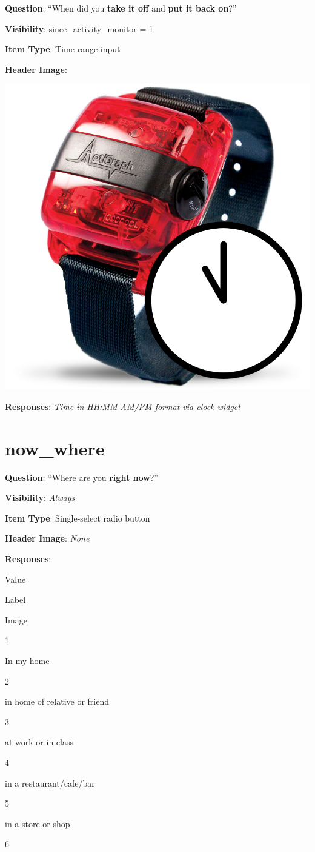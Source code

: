 \documentclass[]{book}
\begin{document}
\textbf{Question}: ``When did you \textbf{take it off} and \textbf{put it back on}?''

\textbf{Visibility}: \protect\hyperlink{since_activity_monitor}{since\_activity\_monitor} = 1

\textbf{Item Type}: Time-range input

\textbf{Header Image}:

\begin{flushleft}\includegraphics[width=0.33\linewidth]{downloadFigs4latex_NIMH_Applet_Codebook/since_activity_monitor_time_headerImg} \end{flushleft}

\textbf{Responses}: \emph{Time in HH:MM AM/PM format via clock widget}

\hypertarget{now_where}{%
\section{now\_where}\label{now_where}}

\textbf{Question}: ``Where are you \textbf{right now}?''

\textbf{Visibility}: \emph{Always}

\textbf{Item Type}: Single-select radio button

\textbf{Header Image}: \emph{None}

\textbf{Responses}:

Value

Label

Image

1

In my home

2

in home of relative or friend

3

at work or in class

4

in a restaurant/cafe/bar

5

in a store or shop

6
\end{document}

